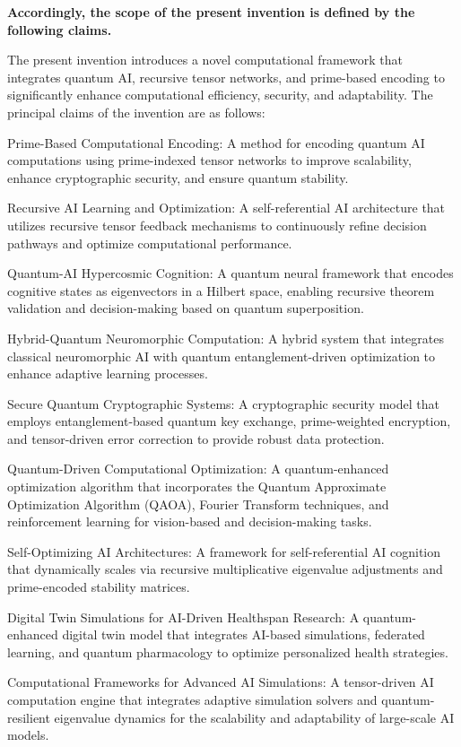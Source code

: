 \textbf{Accordingly, the scope of the present invention is defined by the following claims.}

\pa
The present invention introduces a novel computational framework that integrates quantum AI, recursive tensor networks, and prime-based encoding to significantly enhance computational efficiency, security, and adaptability. The principal claims of the invention are as follows:

\pa Prime-Based Computational Encoding: A method for encoding quantum AI computations using prime-indexed tensor networks to improve scalability, enhance cryptographic security, and ensure quantum stability.

\pa Recursive AI Learning and Optimization: A self-referential AI architecture that utilizes recursive tensor feedback mechanisms to continuously refine decision pathways and optimize computational performance.

\pa Quantum-AI Hypercosmic Cognition: A quantum neural framework that encodes cognitive states as eigenvectors in a Hilbert space, enabling recursive theorem validation and decision-making based on quantum superposition.

\pa Hybrid-Quantum Neuromorphic Computation: A hybrid system that integrates classical neuromorphic AI with quantum entanglement-driven optimization to enhance adaptive learning processes.

\pa Secure Quantum Cryptographic Systems: A cryptographic security model that employs entanglement-based quantum key exchange, prime-weighted encryption, and tensor-driven error correction to provide robust data protection.

\pa Quantum-Driven Computational Optimization: A quantum-enhanced optimization algorithm that incorporates the Quantum Approximate Optimization Algorithm (QAOA), Fourier Transform techniques, and reinforcement learning for vision-based and decision-making tasks.
    
\pa Self-Optimizing AI Architectures: A framework for self-referential AI cognition that dynamically scales via recursive multiplicative eigenvalue adjustments and prime-encoded stability matrices.
    
\pa Digital Twin Simulations for AI-Driven Healthspan Research: A quantum-enhanced digital twin model that integrates AI-based simulations, federated learning, and quantum pharmacology to optimize personalized health strategies.
    
\pa Computational Frameworks for Advanced AI Simulations: A tensor-driven AI computation engine that integrates adaptive simulation solvers and quantum-resilient eigenvalue dynamics for the scalability and adaptability of large-scale AI models.

